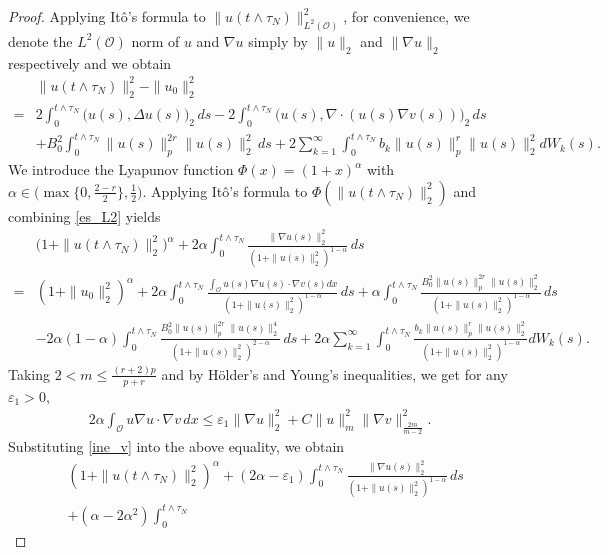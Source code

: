 \documentclass[reqno, 11pt]{amsart}
\theoremstyle{definition}
\numberwithin{equation}{section} \numberwithin{lem}{section}
\numberwithin{thm}{section} \numberwithin{prop}{section}
\numberwithin{cor}{section} \numberwithin{rem}{section}
\numberwithin{defn}{section}
\begin{document}
  \begin{proof}
    	 Applying It\^o's formula to $\|u(t\wedge{\tau_N})\|_{L^2(\mathcal O)}^2$, for convenience, we denote the $L^2(\mathcal{O})$ norm of $u$ and $\nabla u$  simply by $\|u\|_2$ and $\|\nabla u\|_2$ respectively and we obtain
        \begin{align}\label{es_L2}
		\nonumber&\|u(t\wedge{\tau_N})\|_2^2-\|u_0\|_2^2\\
		=&2\int_0^{t\wedge{\tau_N}}\big(u(s),\Delta u(s)\big)_2\,ds
		-2\int_0^{t\wedge{\tau_N}}\big(u(s),\nabla\cdot(u(s)\nabla v(s))\big)_2\,ds
		\nonumber\\
&+B_0^2\int_0^{t\wedge{\tau_N}}\|u(s)\|_p^{2r}\|u(s)\|_2^2\,ds+2\sum_{k=1}^\infty\int_0^{t\wedge{\tau_N}}b_k\|u(s)\|_p^r\|u(s)\|_2^2dW_k(s).
	\end{align}
  We introduce the Lyapunov function $\Phi(x)=(1+x)^\alpha$ with $\alpha\in\big(\max\{0,\frac{2-r}{2}\},\frac{1}{2}\big).$ Applying It\^o's formula to $\Phi(\|u(t\wedge{\tau_N})\|_2^2)$ and combining \eqref{es_L2} yields
	\begin{align*}
		\nonumber&\big(1+\|u(t\wedge{\tau_N})\|_2^2\big)^\alpha
+2\alpha\int_0^{t\wedge{\tau_N}}\frac{\|\nabla u(s)\|_2^2}{(1+\|u(s)\|_2^2)^{1-\alpha}}\,ds
		\\\nonumber
		=&(1+\|u_0\|_2^2)^\alpha
		+2\alpha\int_0^{t\wedge{\tau_N}}
		\frac{\int_{\mathcal O}u(s)\nabla u(s)\cdot \nabla v(s)dx}
		{(1+\|u(s)\|_2^2)^{1-\alpha}}\,ds
+\alpha\int_0^{t\wedge{\tau_N}}
		\frac{B_0^2\|u(s)\|_p^{2r}\|u(s)\|_2^2}
		{(1+\|u(s)\|_2^2)^{1-\alpha}}\,ds
		\\
		&-2\alpha(1-\alpha)\int_0^{t\wedge{\tau_N}}
		\frac{{B_0^2}\|u(s)\|_p^{2r}\|u(s)\|_2^4}
		{(1+\|u(s)\|_2^2)^{2-\alpha}}\,ds
+2\alpha\sum_{k=1}^\infty\int_0^{t\wedge{\tau_N}}
		\frac{b_k\|u(s)\|_p^r\|u(s)\|_2^2}
		{(1+\|u(s)\|_2^2)^{1-\alpha}}dW_k(s).
	\end{align*}
    Taking $2<m\le \frac{(r+2)p}{p+r}$ and  by H\"older's and Young's inequalities,  we get  for any $\varepsilon_1>0$,
	\begin{align}\label{ine_v}
	    2\alpha\int_{\mathcal O}u\nabla u\cdot \nabla v\,dx
	\le
	\varepsilon_1\|\nabla u\|_2^2
	+C\|u\|_m^2\|\nabla v\|_{\frac{2m}{m-2}}^2.
	\end{align}
	Substituting \eqref{ine_v} into the above equality, we obtain
	\begin{align}
		\label{L3}
		\nonumber&(1+\|u(t\wedge{\tau_N})\|_2^2)^\alpha
		+(2\alpha-\varepsilon_1)\int_0^{t\wedge{\tau_N}}\frac{\|\nabla u(s)\|_2^2}{(1+\|u(s)\|_2^2)^{1-\alpha}}\,ds\\\nonumber&+(\alpha-2\alpha^2)\int_0^{t\wedge{\tau_N}}

\end{align}
\end{proof}
\end{document}
